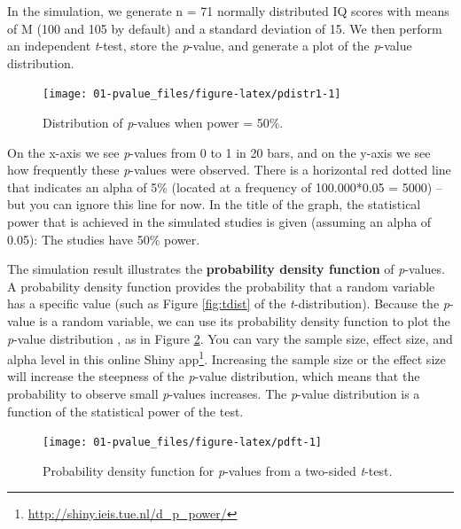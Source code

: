 \documentclass[
  oneside]{krantz}
\renewcommand{\href}[2]{#2\footnote{\url{#1}}}
\begin{document}
In the simulation, we generate n = 71 normally distributed IQ scores with means of M (100 and 105 by default) and a standard deviation of 15. We then perform an independent \emph{t}-test, store the \emph{p}-value, and generate a plot of the \emph{p}-value distribution.



\begin{figure}

{\centering \texttt{[image: 01-pvalue\_files/figure-latex/pdistr1-1]} 

}

\caption{Distribution of \emph{p}-values when power = 50\%.}\label{fig:pdistr1}
\end{figure}

On the x-axis we see \emph{p}-values from 0 to 1 in 20 bars, and on the y-axis we see how frequently these \emph{p}-values were observed. There is a horizontal red dotted line that indicates an alpha of 5\% (located at a frequency of 100.000*0.05 = 5000) -- but you can ignore this line for now. In the title of the graph, the statistical power that is achieved in the simulated studies is given (assuming an alpha of 0.05): The studies have 50\% power.

The simulation result illustrates the \textbf{probability density function} of \emph{p}-values. A probability density function provides the probability that a random variable has a specific value (such as Figure \ref{fig:tdist} of the \emph{t}-distribution). Because the \emph{p}-value is a random variable, we can use its probability density function to plot the \emph{p}-value distribution \citep{hung_behavior_1997, ulrich_properties_2018}, as in Figure \ref{fig:pdft}. You can vary the sample size, effect size, and alpha level in \href{http://shiny.ieis.tue.nl/d_p_power/}{this online Shiny app}. Increasing the sample size or the effect size will increase the steepness of the \emph{p}-value distribution, which means that the probability to observe small \emph{p}-values increases. The \emph{p}-value distribution is a function of the statistical power of the test.



\begin{figure}

{\centering \texttt{[image: 01-pvalue\_files/figure-latex/pdft-1]} 

}

\caption{Probability density function for \emph{p}-values from a two-sided \emph{t}-test.}\label{fig:pdft}
\end{figure}
\end{document}
